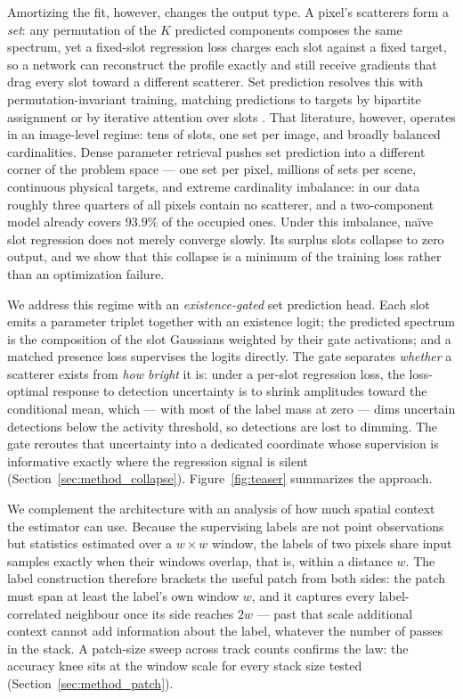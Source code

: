 Amortizing the fit, however, changes the output type. A pixel's scatterers form a \emph{set}: any permutation of the $K$ predicted components composes the same spectrum, yet a fixed-slot regression loss charges each slot against a fixed target, so a network can reconstruct the profile exactly and still receive gradients that drag every slot toward a different scatterer. Set prediction resolves this with permutation-invariant training, matching predictions to targets by bipartite assignment \citep{kuhn1955hungarian, zhang2019dspn, carion2020detr} or by iterative attention over slots \citep{locatello2020slot}. That literature, however, operates in an image-level regime: tens of slots, one set per image, and broadly balanced cardinalities. Dense parameter retrieval pushes set prediction into a different corner of the problem space --- one set per pixel, millions of sets per scene, continuous physical targets, and extreme cardinality imbalance: in our data roughly three quarters of all pixels contain no scatterer, and a two-component model already covers $93.9\%$ of the occupied ones. Under this imbalance, na\"ive slot regression does not merely converge slowly. Its surplus slots collapse to zero output, and we show that this collapse is a minimum of the training loss rather than an optimization failure.

We address this regime with an \emph{existence-gated} set prediction head. Each slot emits a parameter triplet together with an existence logit; the predicted spectrum is the composition of the slot Gaussians weighted by their gate activations; and a matched presence loss supervises the logits directly. The gate separates \emph{whether} a scatterer exists from \emph{how bright} it is: under a per-slot regression loss, the loss-optimal response to detection uncertainty is to shrink amplitudes toward the conditional mean, which --- with most of the label mass at zero --- dims uncertain detections below the activity threshold, so detections are lost to dimming. The gate reroutes that uncertainty into a dedicated coordinate whose supervision is informative exactly where the regression signal is silent (Section~\ref{sec:method_collapse}). Figure~\ref{fig:teaser} summarizes the approach.

We complement the architecture with an analysis of how much spatial context the estimator can use. Because the supervising labels are not point observations but statistics estimated over a $w \times w$ window, the labels of two pixels share input samples exactly when their windows overlap, that is, within a distance $w$. The label construction therefore brackets the useful patch from both sides: the patch must span at least the label's own window $w$, and it captures every label-correlated neighbour once its side reaches $2w$ --- past that scale additional context cannot add information about the label, whatever the number of passes in the stack. A patch-size sweep across track counts confirms the law: the accuracy knee sits at the window scale for every stack size tested (Section~\ref{sec:method_patch}).

